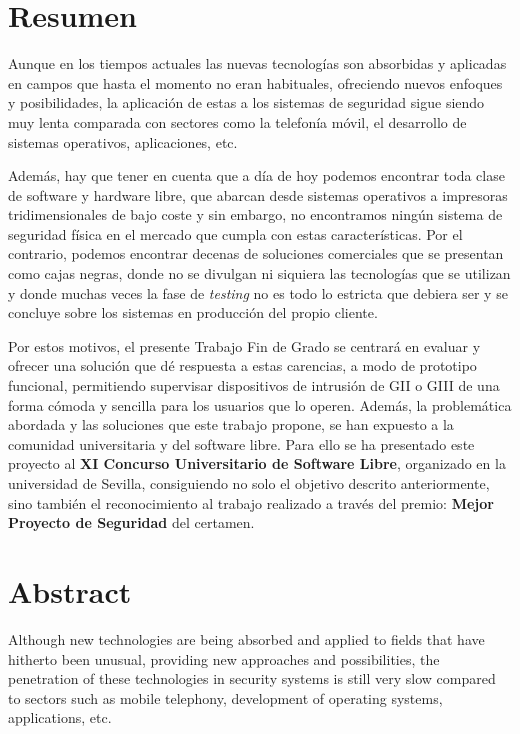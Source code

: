 \chapter{Resumen}


Aunque en los tiempos actuales las nuevas tecnologías son absorbidas y aplicadas en campos que hasta el momento no eran habituales, ofreciendo nuevos enfoques y posibilidades, la aplicación de estas a los sistemas de seguridad sigue siendo muy lenta comparada con sectores como la telefonía móvil, el desarrollo de sistemas operativos, aplicaciones, etc.

Además, hay que tener en cuenta que a día de hoy podemos encontrar toda clase de software y hardware libre, que abarcan desde sistemas operativos a impresoras tridimensionales de bajo coste y sin embargo, no encontramos ningún sistema de seguridad física en el mercado que cumpla con estas características. Por el contrario, podemos encontrar decenas de soluciones comerciales que se presentan como cajas negras, donde no se divulgan ni siquiera las tecnologías que se utilizan y donde muchas veces la fase de \textit{testing} no es todo lo estricta que debiera ser y se concluye sobre los sistemas en producción del propio cliente.

Por estos motivos,  el presente Trabajo Fin de Grado se centrará en evaluar y ofrecer una solución que dé respuesta a estas carencias, a modo de prototipo funcional, permitiendo supervisar dispositivos de intrusión de \acf{GII} o \acf{GIII} de una forma cómoda y sencilla para los usuarios que lo operen. Además, la problemática abordada y las soluciones que este trabajo propone, se han expuesto a la comunidad universitaria y del software libre. Para ello se  ha presentado este proyecto al \textbf{XI Concurso Universitario de Software Libre}, organizado en la universidad de Sevilla, consiguiendo no solo el objetivo descrito anteriormente, sino también el reconocimiento al trabajo realizado a través del premio: \textbf{Mejor Proyecto de Seguridad} del certamen.
 



\chapter{Abstract}

Although new technologies are being absorbed and applied to fields that have hitherto been unusual, providing new approaches and possibilities, the penetration of these \mbox{technologies} in security systems is still very slow compared to sectors such as mobile telephony, \mbox{development} of operating systems, applications, etc.


